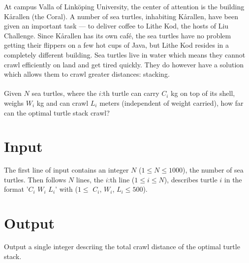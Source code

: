 

At campus Valla of Linköping University, the center of attention is the building Kårallen (the Coral). A number of sea turtles, inhabiting Kårallen, have been given an important task --- to deliver coffee to Lithe Kod, the hosts of Liu Challenge. Since Kårallen has its own café, the sea turtles have no problem getting their flippers on a few hot cups of Java, but Lithe Kod resides in a completely different building. Sea turtles live in water which means they cannot crawl efficiently on land and get tired quickly. They do however have a solution which allows them to crawl greater distances: stacking.\\
\\
Given $N$ sea turtles, where the $i$:th turtle can carry $C_i$ kg on top of its shell, weighs $W_i$ kg and can crawl $L_i$ meters (independent of weight carried), how far can the optimal turtle stack crawl?\\

\section*{Input}
The first line of input contains an integer $N$ ($1 \leq N \leq 1000$), the number of sea turtles. Then follows $N$ lines, the $i$:th line ($1 \leq i \leq N$), describes turtle $i$ in the format '$C_i$ $W_i$ $L_i$' with ($1 \leq$ $C_i$, $W_i$, $L_i \leq 500$).

\section*{Output}
Output a single integer descriing the total crawl distance of the optimal turtle stack.
